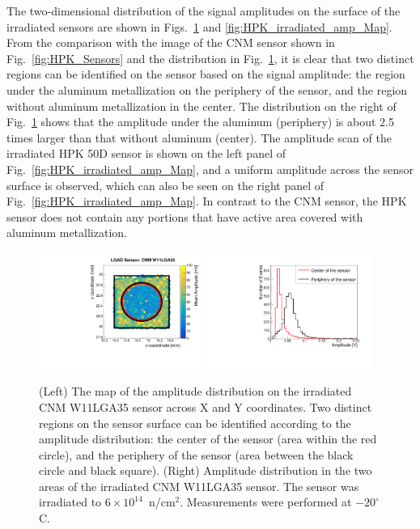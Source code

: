 \documentclass[preprint,1p]{elsarticle}
\begin{document}
The two-dimensional distribution of the signal amplitudes on the surface of the
irradiated sensors are shown in Figs.~\ref{fig:CNM_irradiated_amp_Map} and
\ref{fig:HPK_irradiated_amp_Map}. From the comparison with the image of the CNM
sensor shown in Fig.~\ref{fig:HPK_Sensors} and the distribution in
Fig.~\ref{fig:CNM_irradiated_amp_Map}, it is clear that two distinct regions can
be identified on the sensor based on the signal amplitude: the region under the
aluminum metallization on the periphery of the sensor, and the region without
aluminum metallization in the center. The distribution on the right of
Fig.~\ref{fig:CNM_irradiated_amp_Map} shows that the amplitude under the
aluminum (periphery) is about 2.5 times larger than that without
aluminum (center). The amplitude scan
of the irradiated HPK 50D sensor is shown on the left panel of
Fig.~\ref{fig:HPK_irradiated_amp_Map}, and a uniform amplitude across the
sensor surface is observed, which can also be seen on the right panel of
Fig.~\ref{fig:HPK_irradiated_amp_Map}. In contrast to the CNM sensor, the HPK
sensor does not contain any portions that have active area covered with
aluminum metallization.


\begin{figure}[htbp] 
\centering
\includegraphics[width=0.48\textwidth]{figs/USCSBoard_HPK50DIrradiated-CNMW11LGA35_Run936-961/CNM_irradiated_amp_Map.pdf} \hfill
\includegraphics[width=0.48\textwidth]{figs/USCSBoard_HPK50DIrradiated-CNMW11LGA35_Run936-961/CNM_irradiated_amp_1D.pdf} 
\caption{(Left) The map of the amplitude distribution on the irradiated CNM W11LGA35 sensor across X and Y coordinates. Two distinct regions on the sensor surface can be identified according to the amplitude distribution: the center of the sensor (area within the red circle), and the periphery of the sensor (area between the black circle and black square). (Right) Amplitude distribution in the two areas of the irradiated CNM W11LGA35 sensor. The sensor was irradiated to $6\times 10^{14}$~n/cm$^2$. Measurements were performed at $-20^{\circ}$C.} 
\label{fig:CNM_irradiated_amp_Map} 
\end{figure} 
\end{document}
